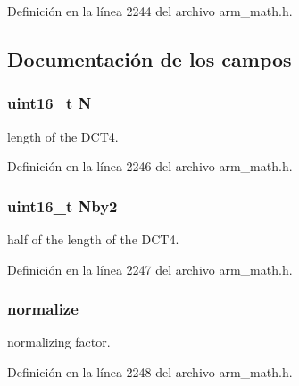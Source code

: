 Definición en la línea 2244 del archivo arm\+\_\+math.\+h.



\subsection{Documentación de los campos}
\subsubsection[{\texorpdfstring{N}{N}}]{\setlength{\rightskip}{0pt plus 5cm}uint16\+\_\+t N}\hypertarget{structarm__dct4__instance__f32_a37d49571fe35012087153c093705cd11}{}\label{structarm__dct4__instance__f32_a37d49571fe35012087153c093705cd11}
length of the D\+C\+T4. 

Definición en la línea 2246 del archivo arm\+\_\+math.\+h.

\subsubsection[{\texorpdfstring{Nby2}{Nby2}}]{\setlength{\rightskip}{0pt plus 5cm}uint16\+\_\+t Nby2}\hypertarget{structarm__dct4__instance__f32_afa64b1618089e35c2b55cff71cb29715}{}\label{structarm__dct4__instance__f32_afa64b1618089e35c2b55cff71cb29715}
half of the length of the D\+C\+T4. 

Definición en la línea 2247 del archivo arm\+\_\+math.\+h.

\subsubsection[{\texorpdfstring{normalize}{normalize}}]{ normalize}\hypertarget{structarm__dct4__instance__f32_a1bf2ed86ef2c3dd83af606bb3f520f2a}{}\label{structarm__dct4__instance__f32_a1bf2ed86ef2c3dd83af606bb3f520f2a}
normalizing factor. 

Definición en la línea 2248 del archivo arm\+\_\+math.\+h.

